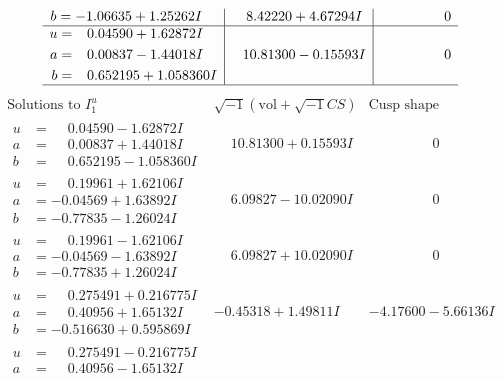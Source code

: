 \documentclass[1p]{elsarticle_modified}
\theoremstyle{definition}
\newcommand{\I}{\sqrt{-1}}
\begin{document}
$$\begin{array}{c|c|c}
\begin{aligned}
b &= -1.06635 + 1.25262 I\end{aligned}
 & \phantom{-}8.42220 + 4.67294 I & \phantom{-0.000000 } 0 \\ \hline\begin{aligned}
u &= \phantom{-}0.04590 + 1.62872 I \\
a &= \phantom{-}0.00837 - 1.44018 I \\
b &= \phantom{-}0.652195 + 1.058360 I\end{aligned}
 & \phantom{-}10.81300 - 0.15593 I & \phantom{-0.000000 } 0\\
 \hline 
 \end{array}$$\newpage$$\begin{array}{c|c|c}  
\text{Solutions to }I^u_{1}& \I (\text{vol} + \sqrt{-1}CS) & \text{Cusp shape}\\
 \hline 
\begin{aligned}
u &= \phantom{-}0.04590 - 1.62872 I \\
a &= \phantom{-}0.00837 + 1.44018 I \\
b &= \phantom{-}0.652195 - 1.058360 I\end{aligned}
 & \phantom{-}10.81300 + 0.15593 I & \phantom{-0.000000 } 0 \\ \hline\begin{aligned}
u &= \phantom{-}0.19961 + 1.62106 I \\
a &= -0.04569 + 1.63892 I \\
b &= -0.77835 - 1.26024 I\end{aligned}
 & \phantom{-}6.09827 - 10.02090 I & \phantom{-0.000000 } 0 \\ \hline\begin{aligned}
u &= \phantom{-}0.19961 - 1.62106 I \\
a &= -0.04569 - 1.63892 I \\
b &= -0.77835 + 1.26024 I\end{aligned}
 & \phantom{-}6.09827 + 10.02090 I & \phantom{-0.000000 } 0 \\ \hline\begin{aligned}
u &= \phantom{-}0.275491 + 0.216775 I \\
a &= \phantom{-}0.40956 + 1.65132 I \\
b &= -0.516630 + 0.595869 I\end{aligned}
 & -0.45318 + 1.49811 I & -4.17600 - 5.66136 I \\ \hline\begin{aligned}
u &= \phantom{-}0.275491 - 0.216775 I \\
a &= \phantom{-}0.40956 - 1.65132 I \\

\end{aligned}
\end{array}$$
\end{document}
